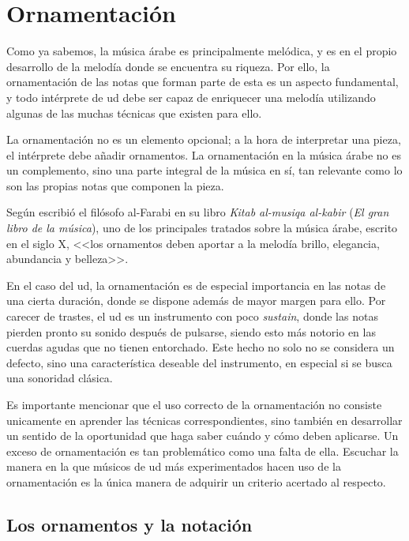 \chapter{Ornamentación}
\label{ornamentacion}

\pagestyle{fancyplain}

Como ya sabemos, la música árabe es principalmente melódica, y es en el propio desarrollo de la melodía donde se encuentra su riqueza. Por ello, la ornamentación de las notas que forman parte de esta es un aspecto fundamental, y todo intérprete de ud debe ser capaz de enriquecer una melodía utilizando algunas de las muchas técnicas que existen para ello.

La ornamentación no es un elemento opcional; a la hora de interpretar una pieza, el intérprete debe añadir ornamentos. La ornamentación en la música árabe no es un complemento, sino una parte integral de la música en sí, tan relevante como lo son las propias notas que componen la pieza.

Según escribió el filósofo al-Farabi en su libro \emph{Kitab al-musiqa al-kabir} (\emph{El gran libro de la música}), uno de los principales tratados sobre la música árabe, escrito en el siglo X, <<los ornamentos deben aportar a la melodía brillo, elegancia, abundancia y belleza>>.

En el caso del ud, la ornamentación es de especial importancia en las notas de una cierta duración, donde se dispone además de mayor margen para ello. Por carecer de trastes, el ud es un instrumento con poco \emph{sustain}, donde las notas pierden pronto su sonido después de pulsarse, siendo esto más notorio en las cuerdas agudas que no tienen entorchado. Este hecho no solo no se considera un defecto, sino una característica deseable del instrumento, en especial si se busca una sonoridad clásica.

Es importante mencionar que el uso correcto de la ornamentación no consiste unicamente en aprender las técnicas correspondientes, sino también en desarrollar un sentido de la oportunidad que haga saber cuándo y cómo deben aplicarse. Un exceso de ornamentación es tan problemático como una falta de ella. Escuchar la manera en la que músicos de ud más experimentados hacen uso de la ornamentación es la única manera de adquirir un criterio acertado al respecto.

\section{Los ornamentos y la notación}

